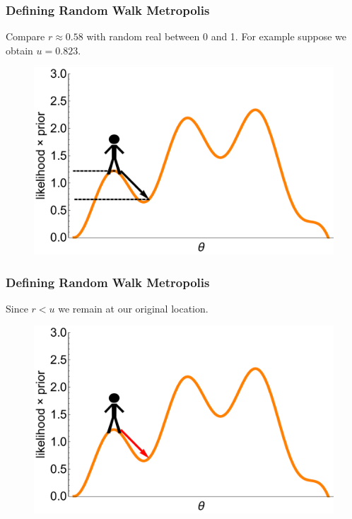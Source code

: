 \documentclass[handout]{beamer}
\begin{document}
\begin{frame}
\frametitle{Defining Random Walk Metropolis}
Compare $r \approx 0.58$ with random real between 0 and 1. For example suppose we obtain $u = 0.823$.

\begin{figure}[ht]
\centerline{\includegraphics[width=1\textwidth]{./Figures/lec4_metropolisDefinition4.pdf}}
\end{figure}

\end{frame}

\begin{frame}
\frametitle{Defining Random Walk Metropolis}
Since $r < u$ we remain at our original location.

\begin{figure}[ht]
\centerline{\includegraphics[width=1\textwidth]{./Figures/lec4_metropolisDefinition5.pdf}}
\end{figure}

\end{frame}
\end{document}
